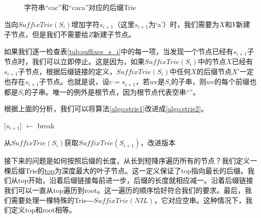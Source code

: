 \documentclass{ctexart}
\begin{document}
\begin{figure}[htbp]
  \centering
  \caption{字符串“cac”和“caca”对应的后缀Trie}
  \label{fig:strie-cac}
\end{figure}

当向$SuffixTrie(S_i)$增加字符$s_{i+1}$（这里$s_{i+1}$为‘a’）时，我们需要为$X$和$Y$新建子节点，但是我们不需要给$Z$新建子节点。

如果我们逐一检查表\cref{tab:suffixes_s_i}中的每一项，当发现一个节点已经有$s_{i+1}$子节点时，我们可以立即停止。这是因为，如果$SuffixTrie(S_i)$中的节点$X$已经有$s_{i+1}$子节点，根据后缀链接的定义，$SuffixTrie(S_i)$中任何$X$的后缀节点$X'$一定也存在$s_{i+1}$子节点。也就是说，设$c=s_{i+1}$，若$wc$是$S_i$的子串，则$wc$的每个前缀也都是$S_i$的子串\cite{ukkonen95}。唯一的例外是根节点，因为根节点代表空串“”。

根据上面的分析，我们可以将算法\cref{algo:strie1}改进成\cref{algo:strie2}。

\begin{algorithm}
  \begin{algorithmic}[1]
      \State {}[$s_{i+1}$] $\gets$ 
    \Else
      \State break
    \EndIf
  \EndFor
  \end{algorithmic}
  \caption{从$SuffixTrie(S_i)$获取$SuffixTrie(S_{i+1})$，改进版本}
  \label{algo:strie2}
\end{algorithm}

接下来的问题是如何按照后缀的长度，从长到短降序遍历所有的节点？我们定义一棵后缀Trie的\underline{top}为深度最大的叶子节点。这一定义保证了top指向最长的后缀。我们从top开始，沿着后缀链接每前进一步，后缀的长度就相应减一。沿着后缀链接我们可以一直从top遍历到root。这一遍历的顺序恰好符合我们的要求。最后，我们需要处理一棵特殊的Trie―$SuffixTrie(NIL)$，它对应空串。这种情况下，我们定义top和root相等。
\end{document}
